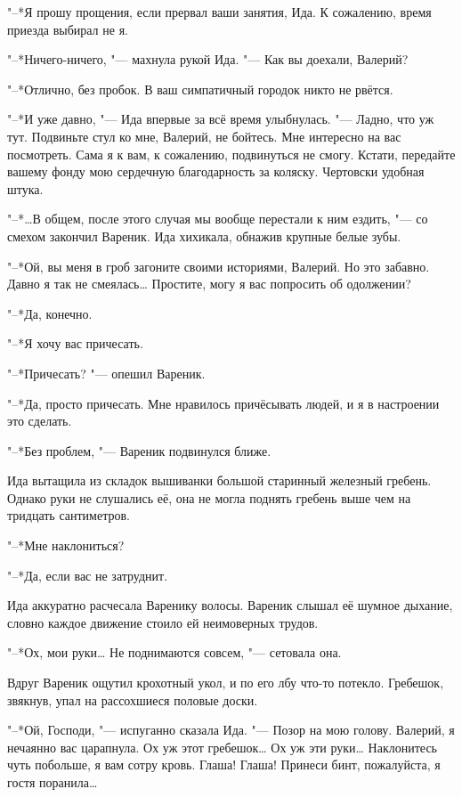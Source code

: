 "--*Я прошу прощения, если прервал ваши занятия, Ида.
К сожалению, время приезда выбирал не я.

"--*Ничего-ничего, "--- махнула рукой Ида.
"--- Как вы доехали, Валерий?

"--*Отлично, без пробок.
В ваш симпатичный городок никто не рвётся.

"--*И уже давно, "--- Ида впервые за всё время улыбнулась.
"--- Ладно, что уж тут.
Подвиньте стул ко мне, Валерий, не бойтесь.
Мне интересно на вас посмотреть.
Сама я к вам, к сожалению, подвинуться не смогу.
Кстати, передайте вашему фонду мою сердечную благодарность за коляску.
Чертовски удобная штука.

\asterism

"--*\ldots{}В общем, после этого случая мы вообще перестали к ним ездить, "--- со смехом закончил Вареник.
Ида хихикала, обнажив крупные белые зубы.

"--*Ой, вы меня в гроб загоните своими историями, Валерий.
Но это забавно.
Давно я так не смеялась\ldots{}
Простите, могу я вас попросить об одолжении?

"--*Да, конечно.

"--*Я хочу вас причесать.

"--*Причесать? "--- опешил Вареник.

"--*Да, просто причесать.
Мне нравилось причёсывать людей, и я в настроении это сделать.

"--*Без проблем, "--- Вареник подвинулся ближе.

Ида вытащила из складок вышиванки большой старинный железный гребень.
Однако руки не слушались её, она не могла поднять гребень выше чем на тридцать сантиметров.

"--*Мне наклониться?

"--*Да, если вас не затруднит.

Ида аккуратно расчесала Варенику волосы.
Вареник слышал её шумное дыхание, словно каждое движение стоило ей неимоверных трудов.

"--*Ох, мои руки\ldots{}
Не поднимаются совсем, "--- сетовала она.

Вдруг Вареник ощутил крохотный укол, и по его лбу что-то потекло.
Гребешок, звякнув, упал на рассохшиеся половые доски.

"--*Ой, Господи, "--- испуганно сказала Ида.
"--- Позор на мою голову.
Валерий, я нечаянно вас царапнула.
Ох уж этот гребешок\ldots{}
Ох уж эти руки\ldots{}
Наклонитесь чуть побольше, я вам сотру кровь.
Глаша!
Глаша!
Принеси бинт, пожалуйста, я гостя поранила\ldots{}

